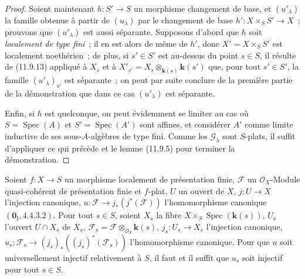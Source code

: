 \begin{proof}
Soient maintenant $h:S'\to S$ un morphisme changement de base, et
$(u'_\lambda)$ la famille obtenue à partir de $(u_\lambda)$ par le changement
de base $h':X\times_S S'\to X$~; prouvons que $(u'_\lambda)$ est aussi
séparante. Supposons d'abord que $h$ soit \emph{localement de type fini}~; il
en est alors de même de $h'$, donc $X'=X\times_S S'$ est localement
noethérien~; de plus, si $s'\in S'$ est au-dessus du point $s\in S$, il résulte
de (11.9.13) appliqué à $X_s$ et à
$X'_{s'}=X_s\otimes_{\mathbf{k}(s)}\boldsymbol{k}(s')$ que, pour tout $s'\in S'$, la famille
$(u'_\lambda)_{s'}$ est séparante~; on peut par suite conclure de la première
partie de la démonstration que dans ce cas $(u'_\lambda)$ est séparante.

Enfin, si $h$ est quelconque, on peut évidemment se limiter au cas où
$S=\operatorname{Spec}(A)$ et $S'=\operatorname{Spec}(A')$ sont affines, et
considérer $A'$ comme limite inductive de ses sous-$A$-algèbres de type fini.
Comme les $\mathcal G_\lambda$ sont $S$-plats, il suffit d'appliquer ce qui
précède et le lemme (11.9.5) pour terminer la démonstration.
\end{proof}

\begin{proposition}[11.9.17]
\label{IV.11.9.17-fr}
Soient $f:X\to S$ un morphisme localement de présentation finie, $\mathcal F$
un $\mathcal O_X$-Module quasi-cohérent de présentation finie et $f$-plat,
$U$ un ouvert de $X$, $j:U\to X$ l'injection canonique,
$u:\mathcal F\to j_*(j^*(\mathcal F))$ l'homomorphisme canonique
$(\mathbf 0_{\mathrm I},4.4.3.2)$. Pour tout $s\in S$, soient $X_s$ la fibre
$X\times_S\operatorname{Spec}(\boldsymbol{k}(s))$, $U_s$ l'ouvert $U\cap X_s$ de $X_s$,
$\mathcal F_s=\mathcal F\otimes_{\mathcal O_S}\boldsymbol{k}(s)$,
$j_s:U_s\to X_s$ l'injection canonique,
$u_s:\mathcal F_s\to(j_s)_*((j_s)^*(\mathcal F_s))$ l'homomorphisme
canonique. Pour que $u$ soit universellement injectif relativement à $S$, il
faut et il suffit que $u_s$ soit injectif pour tout $s\in S$.
\end{proposition}

